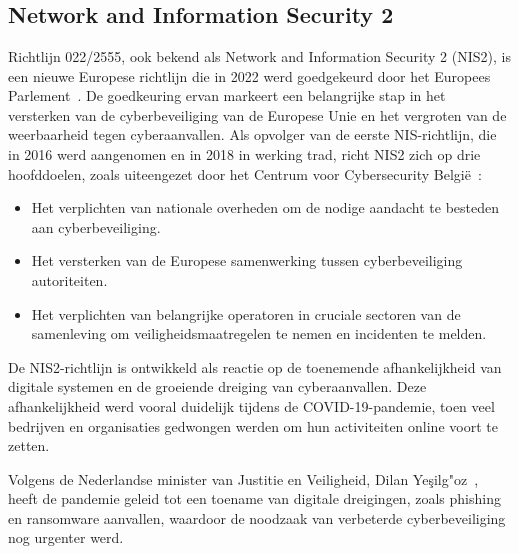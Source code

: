 \chapter{}%
\label{ch:stand-van-zaken}



\section{Network and Information Security 2}%
\label{sec:nis2}

Richtlijn 022/2555, ook bekend als Network and Information Security 2 (NIS2), is een nieuwe Europese richtlijn die in 2022 werd goedgekeurd door het Europees Parlement~\autocite{nis2-eu-be}.
De goedkeuring ervan markeert een belangrijke stap in het versterken van de cyberbeveiliging van de Europese Unie en het vergroten van de weerbaarheid tegen cyberaanvallen.
Als opvolger van de eerste NIS-richtlijn, die in 2016 werd aangenomen en in 2018 in werking trad, richt NIS2 zich op drie hoofddoelen, zoals uiteengezet door het Centrum voor Cybersecurity Belgi\"e~\autocite{nis2-eu-be}:

\begin{itemize}
    \item Het verplichten van nationale overheden om de nodige aandacht te besteden aan cyberbeveiliging.
    \item Het versterken van de Europese samenwerking tussen cyberbeveiliging autoriteiten.
    \item Het verplichten van belangrijke operatoren in cruciale sectoren van de samenleving om veiligheidsmaatregelen te nemen en incidenten te melden.
\end{itemize}

De NIS2-richtlijn is ontwikkeld als reactie op de toenemende afhankelijkheid van digitale systemen en de groeiende dreiging van cyberaanvallen.
Deze afhankelijkheid werd vooral duidelijk tijdens de COVID-19-pandemie, toen veel bedrijven en organisaties gedwongen werden om hun activiteiten online voort te zetten.

Volgens de Nederlandse minister van Justitie en Veiligheid, Dilan Ye\c{s}ilg"oz~\autocite{yesilgoz2022nis}, heeft de pandemie geleid tot een toename van digitale dreigingen, zoals phishing en ransomware aanvallen, waardoor de noodzaak van verbeterde cyberbeveiliging nog urgenter werd.

